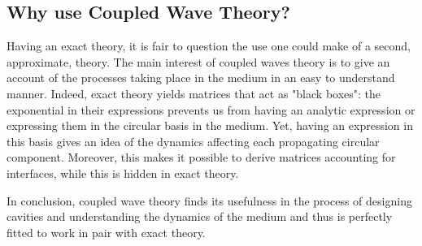 \subsection{Why use Coupled Wave Theory?}
Having an exact theory, it is fair to question the use one could make of a second, approximate, theory. The main interest of coupled waves theory is to give an account of the processes taking place in the medium in an easy to understand manner. Indeed, exact theory yields matrices that act as "black boxes": the exponential in their expressions prevents us from having an analytic expression or expressing them in the circular basis in the medium. Yet, having an expression in this basis gives an idea of the dynamics affecting each propagating circular component. Moreover, this makes it possible to derive matrices accounting for interfaces, while this is hidden in exact theory.

In conclusion, coupled wave theory finds its usefulness in the process of designing cavities and understanding the dynamics of the medium and thus is perfectly fitted to work in pair with exact theory.